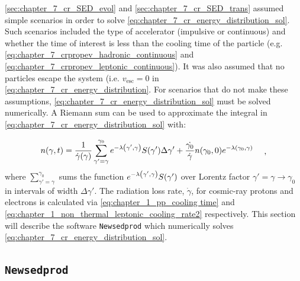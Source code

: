 \autoref{sec:chapter_7_cr_SED_evol} and \autoref{sec:chapter_7_cr_SED_trans} assumed simple scenarios in order to solve \autoref{eq:chapter_7_cr_energy_distribution_sol}. Such scenarios included the type of accelerator (impulsive or continuous) and whether the time of interest is less than the cooling time of the particle (e.g. \autoref{eq:chapter_7_crpropev_hadronic_continuous} and \autoref{eq:chapter_7_crpropev_leptonic_continuous}). It was also assumed that no particles escape the system (i.e. $v_\text{esc}=0$ in \autoref{eq:chapter_7_cr_energy_distribution}. For scenarios that do not make these assumptions, \autoref{eq:chapter_7_cr_energy_distribution_sol} must be solved numerically. A Riemann sum can be used to approximate the integral in \autoref{eq:chapter_7_cr_energy_distribution_sol} with:

\begin{equation}
    \begin{aligned}
	    n\qty(\gamma,t)&=\frac{1}{\dot{\gamma}\qty(\gamma)}\sum_{\gamma'=\gamma}^{\gamma_0} 	e^{-\lambda\qty(\gamma',\gamma)}S\qty(\gamma')\Delta \gamma' + 	\frac{\dot{\gamma_0}}{\dot{\gamma}}n\qty(\gamma_0,0)e^{-\lambda\qty(\gamma_0,\gamma)} 
    \end{aligned} \label{eq:chapter_7_single_zone_numerical}\text{ ,}
\end{equation}
\noindent where $\sum_{\gamma'=\gamma}^{\gamma_0}$ sums the function $e^{-\lambda\qty(\gamma',\gamma)}S\qty(\gamma')$ over Lorentz factor $\gamma'=\gamma\rightarrow \gamma_0$ in intervals of width $\Delta \gamma'$. The radiation loss rate, $\dot{\gamma}$, for cosmic-ray protons and electrons is calculated via \autoref{eq:chapter_1_pp_cooling time} and \autoref{eq:chapter_1_non_thermal_leptonic_cooling_rate2} respectively. This section will describe the software {\tt Newsedprod} which numerically solves \autoref{eq:chapter_7_cr_energy_distribution_sol}.

\subsection{{\tt Newsedprod}} \label{sec_chapter_7_newsedprod}

